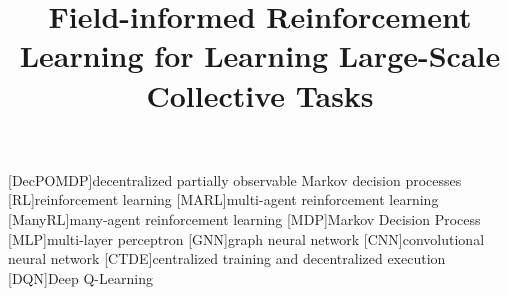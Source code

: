 \documentclass[conference]{IEEEtran}
\begin{document}
%
\title{Field-informed Reinforcement Learning for Learning Large-Scale Collective Tasks} %
%

\author{

\and
{}
\and
{}
}
%
\maketitle              %
%

\newcommand{\meta}[3]{\textcolor{#1}{\textbf{#2}: #3}}
\newcommand{\ga}[1]{\meta{red}{GA}{#1}}
\newcommand{\lukas}[1]{\meta{purple}{Lukas}{#1}}
\newcommand{\mv}[1]{\meta{green}{MV}{#1}}
[DecPOMDP]{decentralized partially observable Markov decision processes}
[RL]{reinforcement learning}
[MARL]{multi-agent reinforcement learning}
[ManyRL]{many-agent reinforcement learning}
[MDP]{Markov Decision Process}
[MLP]{multi-layer perceptron}
[GNN]{graph neural network}
[CNN]{convolutional neural network}
[CTDE]{centralized training and decentralized execution}
[DQN]{Deep Q-Learning}
\end{document}
